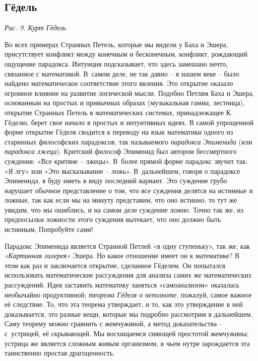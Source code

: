 \documentclass[../main.tex]{subfiles}
\begin{document}
\subsection{Гёдель}

\emph{Рис. 9. Курт Гёдель}

Во всех примерах Странных Петель, которые мы видели у Баха и Эшера, присутствует конфликт между конечным и бесконечным, конфликт, рождающий ощущение парадокса. Интуиция подсказывает, что здесь замешано нечто, связанное с математикой. В~самом деле, не так давно \--- в нашем веке \--- было найдено математическое соответствие этого явления. Это открытие оказало огромное влияние на развитие логической мысли. Подобно Петлям Баха и Эшера, основанным на простых и привычных образах (музыкальная гамма, лестница), открытие Странных Петель в математических системах, принадлежащее К. Гёделю, берет свое начало в простых и интуитивных идеях. В самой упрощенной форме открытие Гёделя сводится к переводу на язык математики одного из старинных философских парадоксов, так называемого \emph{парадокса Эпименида} (или \emph{парадокса лжеца}). Критский философ Эпименид был автором бессмертного суждения: «Все критяне \--- лжецы». В~более прямой форме парадокс звучит так: «Я лгу» или «Это высказывание \--- ложь». В~дальнейшем, говоря о парадоксе Эпименида, я буду иметь в виду последний вариант. Это суждение грубо нарушает обычное представление о том, что все суждения делятся на истинные и ложные, так как если мы на минуту представим, что оно истинно, то тут же увидим, что мы ошиблись, и на самом деле суждение ложно. Точно так же, из предпосылки ложности этого суждения вытекает, что оно должно быть истинным, Попробуйте сами!

Парадокс Эпименида является Странной Петлей «в одну ступеньку», так же, как \emph{«Картинная галерея»} Эшера. Но какое отношение имеет он к математике? В этом как раз и заключается открытие, сделанное Гёделем. Он попытался использовать математические рассуждения для анализа самих же математических рассуждений. Идея заставить математику заняться «самоанализом» оказалась необычайно продуктивной; \emph{теорема Гёделя о неполноте}, пожалуй, самое важное её следствие. То, что эта теорема утверждает, и то, как это утверждение в ней доказывается, это разные вещи, которые мы подробно рассмотрим в дальнейшем. Саму теорему можно сравнить с жемчужиной, а метод доказательства \--- с~устрицей, её скрывающей. Мы восхищаемся сияющей простотой жемчужины; устрица же является сложным живым организмом, в чьем нутре зарождается эта таинственно простая драгоценность.
\end{document}
